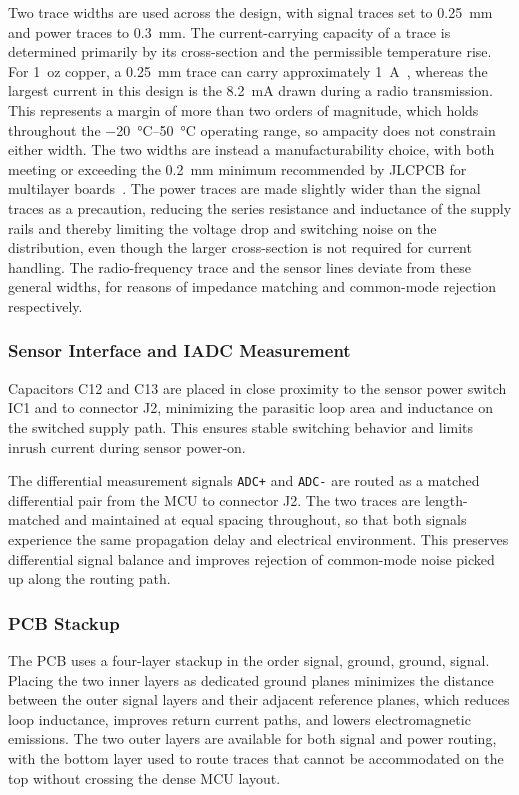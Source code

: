 Two trace widths are used across the design, with signal traces set to \SI{0.25}{\milli\meter} and power traces to \SI{0.3}{\milli\meter}. The current-carrying capacity of a trace is determined primarily by its cross-section and the permissible temperature rise. For \SI{1}{oz} copper, a \SI{0.25}{\milli\meter} trace can carry approximately \SI{1}{\ampere}~\cite{waseem_trace_width_current_2025}, whereas the largest current in this design is the \SI{8.2}{\milli\ampere} drawn during a radio transmission. This represents a margin of more than two orders of magnitude, which holds throughout the \SIrange{-20}{50}{\celsius} operating range, so ampacity does not constrain either width. The two widths are instead a manufacturability choice, with both meeting or exceeding the \SI{0.2}{\milli\meter} minimum recommended by JLCPCB for multilayer boards~\cite{jlcpcb_capabilities}. The power traces are made slightly wider than the signal traces as a precaution, reducing the series resistance and inductance of the supply rails and thereby limiting the voltage drop and switching noise on the distribution, even though the larger cross-section is not required for current handling. The radio-frequency trace and the sensor lines deviate from these general widths, for reasons of impedance matching and common-mode rejection respectively.

\subsubsection{Sensor Interface and IADC Measurement}
Capacitors C12 and C13 are placed in close proximity to the sensor power switch IC1 and to connector J2, minimizing the parasitic loop area and inductance on the switched supply path. This ensures stable switching behavior and limits inrush current during sensor power-on.
 
The differential measurement signals \texttt{ADC+} and \texttt{ADC-} are routed as a matched differential pair from the MCU to connector J2. The two traces are length-matched and maintained at equal spacing throughout, so that both signals experience the same propagation delay and electrical environment. This preserves differential signal balance and improves rejection of common-mode noise picked up along the routing path.

\subsubsection{PCB Stackup}
The PCB uses a four-layer stackup in the order signal, ground, ground, signal. Placing the two inner layers as dedicated ground planes minimizes the distance between the outer signal layers and their adjacent reference planes, which reduces loop inductance, improves return current paths, and lowers electromagnetic emissions. The two outer layers are available for both signal and power routing, with the bottom layer used to route traces that cannot be accommodated on the top without crossing the dense MCU layout.
 
